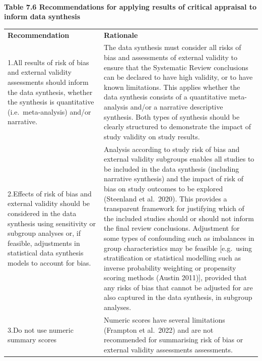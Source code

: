 \documentclass[
  letterpaper,
  DIV=11,
  numbers=noendperiod]{scrreprt}
\makeatletter
\let\oldparagraph\paragraph
\renewcommand{\paragraph}{
    \@ifstar
      \xxxParagraphStar
      \xxxParagraphNoStar
  }
\newcommand{\xxxParagraphStar}[1]{\oldparagraph*{#1}\mbox{}}
\newcommand{\xxxParagraphNoStar}[1]{\oldparagraph{#1}\mbox{}}
\newcounter{none} %
\makeatother
\begin{document}
\paragraph{\texorpdfstring{\textbf{Table 7.6 Recommendations for
applying results of critical appraisal to inform data
synthesis}}{Table 7.6 Recommendations for applying results of critical appraisal to inform data synthesis}}\label{table-7.6-recommendations-for-applying-results-of-critical-appraisal-to-inform-data-synthesis}

{\def\LTcaptype{none} %
\begin{longtable}[]{@{}
  >{\raggedright\arraybackslash}p{}
  >{\raggedright\arraybackslash}p{}@{}}
\toprule\noalign{}
\endhead
\bottomrule\noalign{}
\endlastfoot
\textbf{Recommendation} & \textbf{Rationale} \\
1.All results of risk of bias and external validity assessments should
inform the data synthesis, whether the synthesis is quantitative
(i.e.~meta-analysis) and/or narrative. & The data synthesis must
consider all risks of bias and assessments of external validity to
ensure that the Systematic Review conclusions can be declared to have
high validity, or to have known limitations. This applies whether the
data synthesis consists of a quantitative meta-analysis and/or a
narrative descriptive synthesis. Both types of synthesis should be
clearly structured to demonstrate the impact of study validity on study
results. \\
2.Effects of risk of bias and external validity should be considered in
the data synthesis using sensitivity or subgroup analyses or, if
feasible, adjustments in statistical data synthesis models to account
for bias. & Analysis according to study risk of bias and external
validity subgroups enables all studies to be included in the data
synthesis (including narrative synthesis) and the impact of risk of bias
on study outcomes to be explored (Steenland et al.~2020). This provides
a transparent framework for justifying which of the included studies
should or should not inform the final review conclusions. Adjustment for
some types of confounding such as imbalances in group characteristics
may be feasible {[}e.g.~using stratification or statistical modelling
such as inverse probability weighting or propensity scoring methods
(Austin 2011){]}, provided that any risks of bias that cannot be
adjusted for are also captured in the data synthesis, in subgroup
analyses. \\
3.Do not use numeric summary scores & Numeric scores have several
limitations (Frampton et al.~2022) and are not recommended for
summarising risk of bias or external validity assessments
assessments. \\
\end{longtable}
}
\end{document}
